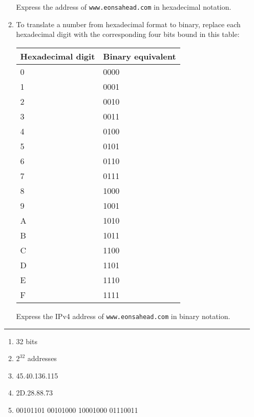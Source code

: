 \documentclass[twoside]{article}
\newenvironment{answer}
  {\vspace*{0.2cm} \rule{12cm}{0.04cm} \vspace*{0.2cm}}
  {\vspace*{0.2cm}}
\begin{document}
\begin{enumerate}
\begin{enumerate}
\begin{itemize}
      \end{itemize}

      Express the address of \verb+www.eonsahead.com+ in hexadecimal
      notation.

    \item To translate a number from hexadecimal format to binary,
      replace each hexadecimal digit with the corresponding
      four bits bound in this table:

      \begin{tabular}{l|l}
        \textbf{Hexadecimal digit} & \textbf{Binary equivalent} \\ \hline
        0 & 0000 \\
        1 & 0001 \\
        2 & 0010 \\
        3 & 0011 \\
        4 & 0100 \\
        5 & 0101 \\
        6 & 0110 \\
        7 & 0111 \\
        8 & 1000 \\
        9 & 1001 \\
        A & 1010 \\
        B & 1011 \\
        C & 1100 \\
        D & 1101 \\
        E & 1110 \\
        F & 1111 \\
        \end{tabular}

      Express the IPv4 address of \verb+www.eonsahead.com+ in binary
      notation.
 
    \end{enumerate}

  \begin{answer}

  \begin{enumerate}
    \item 32 bits
    \item $2^{32}$ addresses
    \item 45.40.136.115
    \item 2D.28.88.73
    \item 00101101 00101000 10001000 01110011
    \end{enumerate}

    \end{answer}


\end{enumerate}
\end{document}
